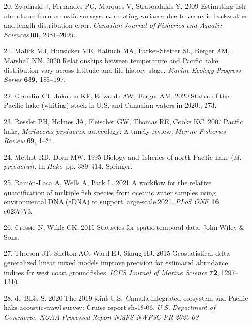 \documentclass[
]{article}
\begin{document}
\leavevmode\hypertarget{ref-zwolinski2009estimating}{}%
20. Zwolinski J, Fernandes PG, Marques V, Stratoudakis Y. 2009
Estimating fish abundance from acoustic surveys: calculating variance
due to acoustic backscatter and length distribution error.
\emph{Canadian Journal of Fisheries and Aquatic Sciences} \textbf{66},
2081--2095.

\leavevmode\hypertarget{ref-malick2020relationships}{}%
21. Malick MJ, Hunsicker ME, Haltuch MA, Parker-Stetter SL, Berger AM,
Marshall KN. 2020 Relationships between temperature and Pacific hake
distribution vary across latitude and life-history stage. \emph{Marine
Ecology Progress Series} \textbf{639}, 185--197.

\leavevmode\hypertarget{ref-grandin2020assessment}{}%
22. Grandin CJ, Johnson KF, Edwards AW, Berger AM. 2020 Status of the
Pacific hake (whiting) stock in U.S. and Canadian waters in 2020., 273.

\leavevmode\hypertarget{ref-ressler2007pacific}{}%
23. Ressler PH, Holmes JA, Fleischer GW, Thomas RE, Cooke KC. 2007
Pacific hake, \textit{Merluccius productus}, autecology: A timely review.
\emph{Marine Fisheries Review} \textbf{69}, 1--24.

\leavevmode\hypertarget{ref-methot1995biology}{}%
24. Methot RD, Dorn MW. 1995 Biology and fisheries of north Pacific hake
(\textit{M. productus}). In \emph{Hake}, pp. 389--414. Springer.

\leavevmode\hypertarget{ref-ramon-laca2021PLOS}{}%
25. Ramón-Laca A, Wells A, Park L. 2021 A workflow for the relative
quantification of multiple fish species from oceanic water samples using
environmental DNA (eDNA) to support large-scale 2021. \emph{PLoS ONE}
\textbf{16}, e0257773.

\leavevmode\hypertarget{ref-cressie2015}{}%
26. Cressie N, Wikle CK. 2015 Statistics for spatio-temporal data. John Wiley \& Sons.

\leavevmode\hypertarget{ref-thorson2015geostatistical}{}%
27. Thorson JT, Shelton AO, Ward EJ, Skaug HJ. 2015 Geostatistical
delta-generalized linear mixed models improve precision for estimated
abundance indices for west coast groundfishes. \emph{ICES Journal of
Marine Science} \textbf{72}, 1297--1310.

\leavevmode\hypertarget{ref-deBlois2020survey}{}%
28. de Blois S. 2020 The 2019 joint U.S.--Canada integrated ecosystem
and Pacific hake acoustic-trawl survey: Cruise report sh-19-06.
\emph{U.S. Department of Commerce, NOAA Processed Report
NMFS-NWFSC-PR-2020-03}
\end{document}
